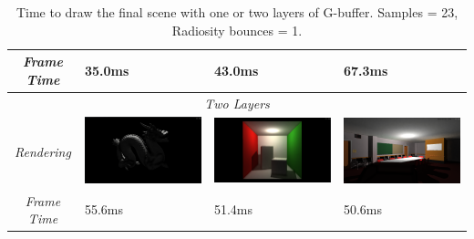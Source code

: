 \begin{table}[!ht]
\begin{center}
\begin{tabular}{| c | p{3.5cm} | p{3.5cm} | p{3.5cm} |}
\hline
\emph{Frame Time} & 35.0ms & 43.0ms & 67.3ms\\
\hline
\multicolumn{4}{|c|}{\emph{Two Layers}} \\
\hline
\emph{Rendering} &
\includegraphics[scale=0.1,trim=0 0 0 -5]{img/results/composite/dragon-2layer} &
\includegraphics[scale=0.1,trim=0 0 0 -5]{img/results/composite/cornell-2layers} &
\includegraphics[scale=0.1,trim=0 0 0 -5]{img/results/composite/conference-2layer} \\
\hline
\emph{Frame Time} & 55.6ms & 51.4ms & 50.6ms\\
\hline
\end{tabular}
\caption{Time to draw the final scene with one or two layers of G-buffer. Samples = 23, Radiosity bounces = 1.}
\label{table-final}
\end{center}
\end{table}

